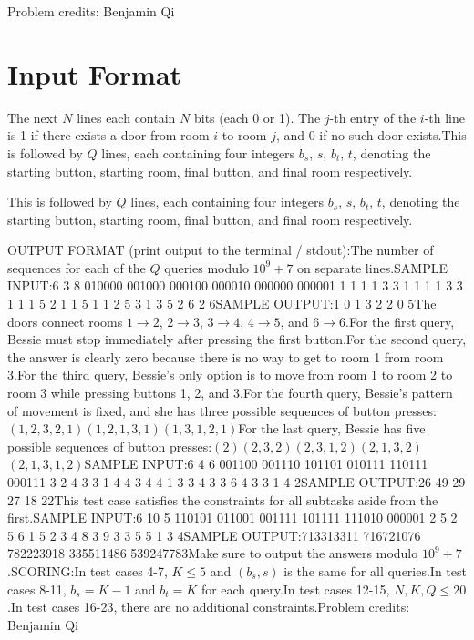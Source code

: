 \documentclass[12pt]{article}
\begin{document}
Problem credits: Benjamin Qi



\section*{Input Format}
The next $N$ lines each contain $N$ bits (each 0 or 1). The $j$-th entry of the
$i$-th line is 1 if there exists a door from room $i$ to room $j$, and 0 if no
such door exists.This is followed by $Q$ lines, each containing four integers $b_s$, $s$, $b_t$,
$t$, denoting the starting button, starting room, final button, and final room
respectively.

This is followed by $Q$ lines, each containing four integers $b_s$, $s$, $b_t$,
$t$, denoting the starting button, starting room, final button, and final room
respectively.

OUTPUT FORMAT (print output to the terminal / stdout):The number of sequences for each of the $Q$ queries modulo $10^9+7$ on separate
lines.SAMPLE INPUT:6 3 8
010000
001000
000100
000010
000000
000001
1 1 1 1
3 3 1 1
1 1 3 3
1 1 1 5
2 1 1 5
1 1 2 5
3 1 3 5
2 6 2 6SAMPLE OUTPUT:1
0
1
3
2
2
0
5The doors connect rooms $1\to 2$, $2 \to 3$, $3\to 4$, $4\to 5$, and $6\to 6$.For the first query, Bessie must stop immediately after pressing the first
button.For the second query, the answer is clearly zero because there is no way to get
to room 1 from room 3.For the third query, Bessie's only option is to move from room 1 to room 2 to
room 3 while pressing buttons 1, 2, and 3.For the fourth query, Bessie's pattern of movement is fixed, and she has three
possible sequences of button presses:$(1,2,3,2,1)$$(1,2,1,3,1)$$(1,3,1,2,1)$For the last query, Bessie has five possible sequences of button presses:$(2)$$(2,3,2)$$(2,3,1,2)$$(2,1,3,2)$$(2,1,3,1,2)$SAMPLE INPUT:6 4 6
001100
001110
101101
010111
110111
000111
3 2 4 3
3 1 4 4
3 4 4 1
3 3 4 3
3 6 4 3
3 1 4 2SAMPLE OUTPUT:26
49
29
27
18
22This test case satisfies the constraints for all subtasks aside from the first.SAMPLE INPUT:6 10 5
110101
011001
001111
101111
111010
000001
2 5 2 5
6 1 5 2
3 4 8 3
9 3 3 5
5 1 3 4SAMPLE OUTPUT:713313311
716721076
782223918
335511486
539247783Make sure to output the answers modulo $10^9+7$.SCORING:In test cases 4-7, $K\le 5$ and $(b_s,s)$ is the same for all queries.In test cases 8-11, $b_s=K-1$ and $b_t=K$ for each query.In test cases 12-15, $N,K,Q\le 20$.In test cases 16-23, there are no additional constraints.Problem credits: Benjamin Qi
\end{document}
